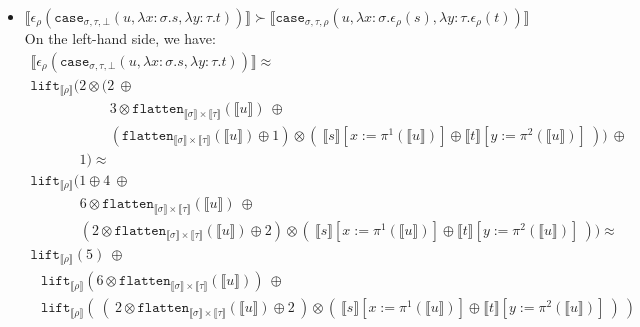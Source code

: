 \documentclass[a4paper,UKenglish,cleveref,autoref,numberwithinsect]{lipics-v2019}
\theoremstyle{definition}
\newcommand{\abs}[2]{\lambda #1.#2}
\newcommand{\flatten}{\mathtt{flatten}}
\newcommand{\lift}{\mathtt{lift}}
\newcommand{\typeinterpret}[1]{\llbracket #1 \rrbracket}
\newcommand{\interpret}[1]{\llbracket #1 \rrbracket}
\begin{document}
\begin{itemize}
\item $\interpret{\epsilon_\rho(\mathtt{case}_{\sigma,\tau,\bot}(u,
  \abs{x:\sigma}{s},\abs{y:\tau}{t}))} \succ
  \interpret{\mathtt{case}_{\sigma,\tau,\rho}(u,
  \abs{x:\sigma}{\epsilon_\rho(s)},\abs{y:\tau}{\epsilon_\rho(t)})}$ \\
  On the left-hand side, we have:
  \[
  \begin{array}{l}
  \interpret{\epsilon_\rho(\mathtt{case}_{\sigma,\tau,\bot}(u,
  \abs{x:\sigma}{s},\abs{y:\tau}{t}))} \approx \\
  \lift_{\typeinterpret{\rho}}(2 \otimes (
  2\ \oplus \\
  \phantom{ABCDEFG,}
  3 \otimes \flatten_{\typeinterpret{\sigma} \times
    \typeinterpret{\tau}}(\interpret{u})\ \oplus \\
  \phantom{ABCDEFG,}
  (\flatten_{\typeinterpret{\sigma} \times \typeinterpret{\tau}}(
    \interpret{u}) \oplus 1) \otimes (\ 
      \interpret{s}[x:=\pi^1(\interpret{u})] \oplus
      \interpret{t}[y:=\pi^2(\interpret{u})]\ )
  )\ \oplus \\
  \phantom{ABCD,} 1) \approx \\
  \lift_{\typeinterpret{\rho}}(
  1 \oplus 4\ \oplus \\
    \phantom{ABCDe}
    6 \otimes \flatten_{\typeinterpret{\sigma} \times
    \typeinterpret{\tau}}(\interpret{u})\ \oplus \\
    \phantom{ABCDe}
  (2 \otimes \flatten_{\typeinterpret{\sigma} \times \typeinterpret{\tau}}(
    \interpret{u}) \oplus 2) \otimes (\ 
      \interpret{s}[x:=\pi^1(\interpret{u})] \oplus
      \interpret{t}[y:=\pi^2(\interpret{u})]\ )) \approx \\
  \lift_{\typeinterpret{\rho}}(5)\ \oplus \\
  \phantom{A}
    \lift_{\typeinterpret{\rho}}(6 \otimes
      \flatten_{\typeinterpret{\sigma} \times
      \typeinterpret{\tau}}(\interpret{u}))\ \oplus \\
  \phantom{A}
    \lift_{\typeinterpret{\rho}}(\ 
      (\ 2 \otimes \flatten_{\typeinterpret{\sigma} \times
      \typeinterpret{\tau}}(\interpret{u}) \oplus 2\ ) \otimes
      (\ \interpret{s}[x:=\pi^1(\interpret{u})] \oplus
      \interpret{t}[y:=\pi^2(\interpret{u})]\ )\ )
  \end{array}
  \]


\end{itemize}
\end{document}
